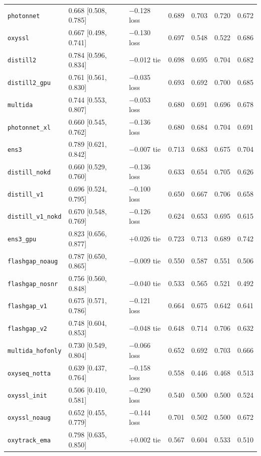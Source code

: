 {\begin{longtable}{@{}p{3.4cm}p{3.3cm}p{2.7cm}cccc@{}}
\texttt{photonnet} & 0.668 [0.508, 0.785] & $-$0.128 loss & 0.689 & 0.703 & 0.720 & 0.672 \\
\texttt{oxyssl} & 0.667 [0.498, 0.741] & $-$0.130 loss & 0.697 & 0.548 & 0.522 & 0.686 \\
\texttt{distill2} & 0.784 [0.596, 0.834] & $-$0.012 tie & 0.698 & 0.695 & 0.704 & 0.682 \\
\texttt{distill2\_gpu} & 0.761 [0.561, 0.830] & $-$0.035 loss & 0.693 & 0.692 & 0.700 & 0.685 \\
\texttt{multida} & 0.744 [0.553, 0.807] & $-$0.053 loss & 0.680 & 0.691 & 0.696 & 0.678 \\
\texttt{photonnet\_xl} & 0.660 [0.545, 0.762] & $-$0.136 loss & 0.680 & 0.684 & 0.704 & 0.691 \\
\texttt{ens3} & 0.789 [0.621, 0.842] & $-$0.007 tie & 0.713 & 0.683 & 0.675 & 0.704 \\
\texttt{distill\_nokd} & 0.660 [0.529, 0.760] & $-$0.136 loss & 0.633 & 0.654 & 0.705 & 0.626 \\
\texttt{distill\_v1} & 0.696 [0.524, 0.795] & $-$0.100 loss & 0.650 & 0.667 & 0.706 & 0.658 \\
\texttt{distill\_v1\_nokd} & 0.670 [0.548, 0.769] & $-$0.126 loss & 0.624 & 0.653 & 0.695 & 0.615 \\
\texttt{ens3\_gpu} & 0.823 [0.656, 0.877] & $+$0.026 tie & 0.723 & 0.713 & 0.689 & 0.742 \\
\texttt{flashgap\_noaug} & 0.787 [0.650, 0.865] & $-$0.009 tie & 0.550 & 0.587 & 0.551 & 0.506 \\
\texttt{flashgap\_nosnr} & 0.756 [0.560, 0.848] & $-$0.040 tie & 0.533 & 0.565 & 0.521 & 0.492 \\
\texttt{flashgap\_v1} & 0.675 [0.571, 0.786] & $-$0.121 loss & 0.664 & 0.675 & 0.642 & 0.641 \\
\texttt{flashgap\_v2} & 0.748 [0.604, 0.853] & $-$0.048 tie & 0.648 & 0.714 & 0.706 & 0.632 \\
\texttt{multida\_hofonly} & 0.730 [0.549, 0.804] & $-$0.066 loss & 0.652 & 0.692 & 0.703 & 0.666 \\
\texttt{oxyseq\_notta} & 0.639 [0.437, 0.764] & $-$0.158 loss & 0.558 & 0.446 & 0.468 & 0.513 \\
\texttt{oxyssl\_init} & 0.506 [0.410, 0.581] & $-$0.290 loss & 0.540 & 0.500 & 0.500 & 0.524 \\
\texttt{oxyssl\_noaug} & 0.652 [0.455, 0.779] & $-$0.144 loss & 0.701 & 0.502 & 0.500 & 0.672 \\
\texttt{oxytrack\_ema} & 0.798 [0.635, 0.850] & $+$0.002 tie & 0.567 & 0.604 & 0.533 & 0.510 \\

\end{longtable}}

